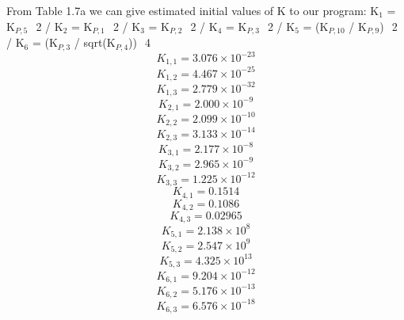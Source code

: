 \documentclass[10pt,fleqn]{article}
\begin{document}
\vspace{0.04in}
\noindent
\rm From Table 1.7a we can give estimated initial values of K to our program:\newline
K$_{1}$ = K$_{P,5}$ $^{}$ 2      /      K$_{2}$ = K$_{P,1}$ $^{}$ 2      /      K$_{3}$ = K$_{P,2}$ $^{}$ 2      /      K$_{4}$ = K$_{P,3}$ $^{}$ 2      /      K$_{5}$ = (K$_{P,10}$ / K$_{P,9}$) $^{}$ 2      /      K$_{6}$ = (K$_{P,3}$ / sqrt(K$_{P,4}$)) $^{}$ 4
\begin{equation}
\label{EES Eqn:60}
K_{1,1} = 3.076\times 10^{-23} 
\end{equation}
\begin{equation}
\label{EES Eqn:61}
K_{1,2} = 4.467\times 10^{-25} 
\end{equation}
\begin{equation}
\label{EES Eqn:62}
K_{1,3} = 2.779\times 10^{-32} 
\end{equation}
\begin{equation}
\label{EES Eqn:63}
K_{2,1} = 2.000\times 10^{-9} 
\end{equation}
\begin{equation}
\label{EES Eqn:64}
K_{2,2} = 2.099\times 10^{-10} 
\end{equation}
\begin{equation}
\label{EES Eqn:65}
K_{2,3} = 3.133\times 10^{-14} 
\end{equation}
\begin{equation}
\label{EES Eqn:66}
K_{3,1} = 2.177\times 10^{-8} 
\end{equation}
\begin{equation}
\label{EES Eqn:67}
K_{3,2} = 2.965\times 10^{-9} 
\end{equation}
\begin{equation}
\label{EES Eqn:68}
K_{3,3} = 1.225\times 10^{-12} 
\end{equation}
\begin{equation}
\label{EES Eqn:69}
K_{4,1} = 0.1514 
\end{equation}
\begin{equation}
\label{EES Eqn:70}
K_{4,2} = 0.1086 
\end{equation}
\begin{equation}
\label{EES Eqn:71}
K_{4,3} = 0.02965 
\end{equation}
\begin{equation}
\label{EES Eqn:72}
K_{5,1} = 2.138\times 10^{8} 
\end{equation}
\begin{equation}
\label{EES Eqn:73}
K_{5,2} = 2.547\times 10^{9} 
\end{equation}
\begin{equation}
\label{EES Eqn:74}
K_{5,3} = 4.325\times 10^{13} 
\end{equation}
\begin{equation}
\label{EES Eqn:75}
K_{6,1} = 9.204\times 10^{-12} 
\end{equation}
\begin{equation}
\label{EES Eqn:76}
K_{6,2} = 5.176\times 10^{-13} 
\end{equation}
\begin{equation}
\label{EES Eqn:77}
K_{6,3} = 6.576\times 10^{-18} 
\end{equation}
\end{document}
